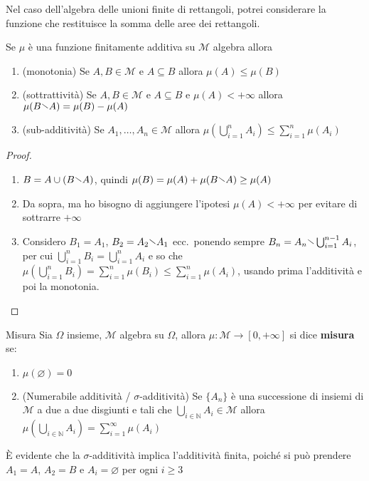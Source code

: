 \begin{example}
    Nel caso dell'algebra delle unioni finite di rettangoli, potrei considerare
    la funzione che restituisce la somma delle aree dei rettangoli.
\end{example}

\begin{proposition}
    Se \(\mu\) è una funzione finitamente additiva su \(\mathcal{M}\) algebra
    allora
\begin{enumerate}[label = \arabic*.]
    \item (monotonia) Se \(A, B \in \mathcal{M}\) e \(A \subseteq B \) allora \(\mu(A) \le
        \mu(B)\) 
    \item (sottrattività) Se \(A, B \in \mathcal{M}\) e \(A \subseteq B \) e \(\mu(A) <
        +\infty\) allora \(\mu(B \sminus A) = \mu(B) - \mu(A)\) 
    \item (sub-additività) Se \(A_{1}, \dots, A_{n} \in \mathcal{M} \) allora \(\mu\left(\bigcup_{i =
        1}^n A_{i}\right) \le \sum_{i=1}^{n} \mu(A_{i})\) 
\end{enumerate}
\end{proposition}
\begin{proof} \(\) 
\begin{enumerate}[label = \arabic*.]
    \item \(B = A \cup (B \sminus A)\), quindi \(\mu(B) = \mu(A) + \mu(B
        \sminus A) \ge \mu(A)\) 
    \item Da sopra, ma ho bisogno di aggiungere l'ipotesi \(\mu(A) < +\infty\)
        per evitare di sottrarre \(+\infty\) 
    \item Considero \(B_{1} = A_{1}\), \(B_{2} = A_{2} \sminus A_{1}\)
        ecc.\ ponendo sempre \(B_{n} = A_{n} \sminus \bigcup_{i=1}^{n-1}
        A_{i}\), per cui \(\bigcup_{i=1}^{n} B_{i} = \bigcup_{i=1}^{n} A_{i}  \)
        e so che \(\mu(\bigcup_{i=1}^{n} B_{i}) = \sum_{i=1}^{n} \mu(B_{i}) \le
        \sum_{i=1}^{n} \mu(A_{i})\), usando prima l'additività e poi la monotonia.
\end{enumerate}
\end{proof}

\begin{definition}{Misura}
    Sia \(\Omega\) insieme, \(\mathcal{M}\) algebra su \(\Omega\), allora \(\mu
    : \mathcal{M} \to [0, +\infty]\) si dice \textbf{misura} se:
\begin{enumerate}[label = \arabic*.]
    \item \(\mu(\varnothing) = 0\) 
    \item (Numerabile additività / \(\sigma\)-additività) Se \(\{A_{n}\} \) è una successione di insiemi di \(\mathcal{M}\) a
        due a due disgiunti e tali che  \(\bigcup_{i \in \mathbb{N}} A_{i} \in
        \mathcal{M}\) allora \(\mu\left( \bigcup_{i \in \mathbb{N}} A_{i}
        \right) = \sum_{i=1}^{\infty} \mu(A_{i})  \) 
\end{enumerate}
\end{definition}
\begin{remark}
    È evidente che la \(\sigma\)-additività implica l'additività finita, poiché
    si può prendere \(A_{1} = A\), \(A_{2} = B\) e \(A_{i} = \varnothing\) per
    ogni \(i \ge 3\) 
\end{remark}

